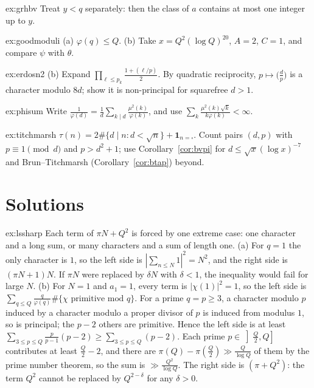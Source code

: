 \begin{hint}{ex:grhbv}
Treat $y<q$ separately: then the class of $a$ contains at most one integer up to $y$.
\end{hint}

\begin{hint}{ex:goodmoduli}
(a) $\varphi(q)\le Q$. (b) Take $x=Q^2(\log Q)^{20}$, $A=2$, $C=1$, and compare $\psi$ with $\theta$.
\end{hint}

\begin{hint}{ex:erdosn2}
(b) Expand $\prod_{\ell\le p_k}\frac{1+(\ell/p)}2$. By quadratic reciprocity, $p\mapsto\bigl(\frac dp\bigr)$ is a character modulo $8d$; show it is non-principal for squarefree $d>1$.
\end{hint}

\begin{hint}{ex:phisum}
Write $\frac1{\varphi(d)}=\frac1d\sum_{k\mid d}\frac{\mu^2(k)}{\varphi(k)}$, and use $\sum_k\frac{\mu^2(k)\sqrt k}{k\varphi(k)}<\infty$.
\end{hint}

\begin{hint}{ex:titchmarsh}
$\tau(n)=2\#\{d\mid n:d<\sqrt n\}+\mathbf 1_{n=\square}$. Count pairs $(d,p)$ with $p\equiv1\pmod d$ and $p>d^2+1$; use Corollary~\ref{cor:bvpi} for $d\le\sqrt x(\log x)^{-7}$ and Brun--Titchmarsh (Corollary~\ref{cor:btap}) beyond.
\end{hint}

\section{Solutions}

\begin{solution}{ex:lssharp}
\idea Each term of $\pi N+Q^2$ is forced by one extreme case: one character and a long sum, or many characters and a sum of length one.
\writeup (a) For $q=1$ the only character is $1$, so the left side is $|\sum_{n\le N}1|^2=N^2$, and the right side is $(\pi N+1)N$. If $\pi N$ were replaced by $\delta N$ with $\delta<1$, the inequality would fail for large $N$.
(b) For $N=1$ and $a_1=1$, every term is $|\chi(1)|^2=1$, so the left side is $\sum_{q\le Q}\frac q{\varphi(q)}\#\{\chi\text{ primitive mod }q\}$. For a prime $q=p\ge3$, a character modulo $p$ induced by a character modulo a proper divisor of $p$ is induced from modulus $1$, so is principal; the $p-2$ others are primitive. Hence the left side is at least $\sum_{3\le p\le Q}\frac p{p-1}(p-2)\ge\sum_{3\le p\le Q}(p-2)$. Each prime $p\in\left]\frac Q2,Q\right]$ contributes at least $\frac Q2-2$, and there are $\pi(Q)-\pi(\frac Q2)\gg\frac Q{\log Q}$ of them by the prime number theorem, so the sum is $\gg\frac{Q^2}{\log Q}$. The right side is $(\pi+Q^2)$: the term $Q^2$ cannot be replaced by $Q^{2-\delta}$ for any $\delta>0$.
\end{solution}

